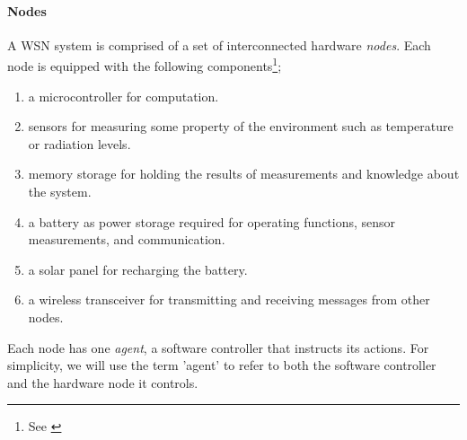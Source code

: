 \paragraph{Nodes}
A WSN system is comprised of a set of interconnected hardware \textit{nodes}. Each node is equipped with the following components\footnote{See \cite{muhammad_r_ahmed_2012_1072589}};
\begin{enumerate}
	\item a microcontroller for computation.
	\item sensors for measuring some property of the environment such as temperature or radiation levels.
	\item memory storage for holding the results of measurements and knowledge about the system.
	\item a battery as power storage required for operating functions, sensor measurements, and communication.
	\item a solar panel for recharging the battery.
	\item  a wireless transceiver for  transmitting and receiving messages from other nodes.
\end{enumerate}

Each node has one \textit{agent}, a software controller that instructs its actions. For simplicity, we will use the term 'agent' to refer to both the software controller and the hardware node it controls.
